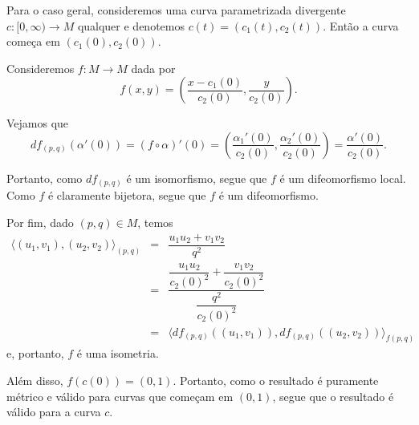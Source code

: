 \documentclass[twoside,openright,titlepage,numbers=noenddot,headinclude,  lineheaders footinclude=true,cleardoublepage=empty,BCOR=5mm,paper=a4,fontsize=12pt ]{scrbook}
\begin{document}
Para o caso geral, consideremos uma curva parametrizada divergente $c:[0, \infty) \longrightarrow M$ qualquer e denotemos $c(t) = (c_1(t), c_2(t))$.
Então a curva começa em $(c_1(0), c_2(0))$.

Consideremos $f : M \rightarrow M$ dada por $$ f(x, y) = \left( \frac{x - c_1(0)}{c_2(0)} , \frac{y}{c_2(0)}\right) .$$

Vejamos que $$ df_{(p, q)}(\alpha '(0)) = (f \circ \alpha)'(0) = \left( \frac{\alpha _1'(0)}{c_2(0)}, \frac{\alpha _2 '(0)}{c_2(0)} \right) = \frac{\alpha '(0)}{c_2(0)} .$$

Portanto, como $df_{(p, q)}$ é um isomorfismo, segue que $f$ é um difeomorfismo local. Como $f$ é claramente bijetora, segue que $f$ é um difeomorfismo.

Por fim, dado $(p, q) \in M$, temos 
\begin{equation*}
\begin{array}{rcl}
\langle (u_1, v_1), (u_2, v_2) \rangle _{(p, q)} & = & \dfrac{u_1u_2 + v_1v_2}{q^2} \\
& = & \dfrac{\dfrac{u_1u_2}{c_2(0)^2} + \dfrac{v_1v_2}{c_2(0)^2}}{\dfrac{q^2}{c_2(0)^2}} \\
& = & \langle df_{(p, q)}((u_1, v_1)), df_{(p, q)}((u_2, v_2)) \rangle _{f(p, q)}
\end{array}
\end{equation*}
e, portanto, $f$ é uma isometria.

Além disso, $f(c(0)) = (0, 1)$.
Portanto, como o resultado é puramente métrico e válido para curvas que começam em $(0, 1)$, segue que o resultado é válido para a curva $c$.
\end{document}
